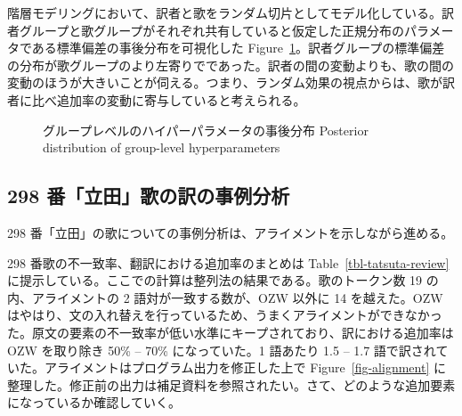 \documentclass[
  letterpaper,
  DIV=11,
  numbers=noendperiod]{scrartcl}
\begin{document}
階層モデリングにおいて、訳者と歌をランダム切片としてモデル化している。訳者グループと歌グループがそれぞれ共有していると仮定した正規分布のパラメータである標準偏差の事後分布を可視化した
Figure~\ref{fig-hyperparameter}。訳者グループの標準偏差の分布が歌グループのより左寄りでであった。訳者の間の変動よりも、歌の間の変動のほうが大きいことが伺える。つまり、ランダム効果の視点からは、歌が訳者に比べ追加率の変動に寄与していると考えられる。

\begin{figure}


\caption[グループレベルのハイパーパラメータの事後分布]{\label{fig-hyperparameter}グループレベルのハイパーパラメータの事後分布
Posterior distribution of group-level hyperparameters}

\end{figure}%

\subsection{298
番「立田」歌の訳の事例分析}\label{ux756aux7acbux7530ux6b4cux306eux8a33ux306eux4e8bux4f8bux5206ux6790}

298 番「立田」の歌についての事例分析は、アライメントを示しながら進める。

298 番歌の不一致率、翻訳における追加率のまとめは
Table~\ref{tbl-tatsuta-review}
に提示している。ここでの計算は整列法の結果である。歌のトークン数 19
の内、アライメントの 2 語対が一致する数が、OZW 以外に 14 を越えた。OZW
はやはり、文の入れ替えを行っているため、うまくアライメントができなかった。原文の要素の不一致率が低い水準にキープされており、訳における追加率は
OZW を取り除き 50\% -- 70\% になっていた。1 語あたり 1.5 -- 1.7
語で訳されていた。アライメントはプログラム出力を修正した上で
Figure~\ref{fig-alignment}
に整理した。修正前の出力は補足資料を参照されたい。さて、どのような追加要素になっているか確認していく。
\end{document}
